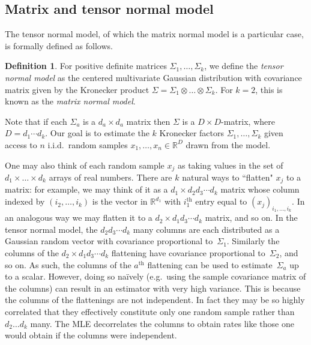 \documentclass[aos]{imsart}
\theoremstyle{definition}
\newtheorem*{definition}{Definition}
\numberwithin{equation}{section}
\newcommand{\R}{{\mathbb{R}}}
\newcommand{\ot}{\otimes}
\begin{document}
\subsection{Matrix and tensor normal model}\label{subsec:model}
The tensor normal model, of which the matrix normal model is a particular case, is formally defined as follows.

\begin{definition}
For positive definite matrices $\Sigma_1,\dots,\Sigma_k$, we define the \emph{tensor normal model} as the centered multivariate Gaussian distribution with covariance matrix given by the Kronecker product $\Sigma = \Sigma_1 \ot \dots \ot \Sigma_k$.
For $k=2$, this is known as the \emph{matrix normal model}.
\end{definition}

\noindent
Note that if each $\Sigma_a$ is a $d_a\times d_a$ matrix then $\Sigma$ is a $D\times D$-matrix, where $D=d_1 \cdots d_k$.
Our goal is to estimate the $k$ Kronecker factors $\Sigma_1, \dots, \Sigma_k$ given access to $n$ i.i.d.\ random samples $x_1, \dots, x_n \in \R^D$ drawn from the model.

One may also think of each random sample $x_j$ as taking values in the set of $d_1 \times \dots \times d_k$ arrays of real numbers.
There are $k$ natural ways to ``flatten" $x_j$ to a matrix:
for example, we may think of it as a $d_1 \times d_2d_3\cdots{}d_k$ matrix whose column indexed by $(i_2,\dots, i_k)$ is the vector in $\R^{d_1}$ with $i_1^{\text{th}}$ entry equal to $(x_j)_{i_1, \dots, i_k}$.
In an analogous way we may flatten it to a $d_2 \times d_1d_3\cdots{}d_k$ matrix, and so on.
In the tensor normal model, the $d_2d_3\cdots{}d_k$ many columns are each distributed as a Gaussian random vector with covariance proportional to~$\Sigma_1$.
Similarly the columns of the $d_2 \times d_1d_3\cdots{}d_k$ flattening have covariance proportional to~$\Sigma_2$, and so on.
As such, the columns of the $a^{\text{th}}$ flattening can be used to estimate~$\Sigma_a$ up to a scalar.
However, doing so na\"ively (e.g.\ using the sample covariance matrix of the columns) can result in an estimator with very high variance.
This is because the columns of the flattenings are not independent.
In fact they may be so highly correlated that they effectively constitute only one random sample rather than $d_2\dots d_k$ many.
The MLE decorrelates the columns to obtain rates like those one would obtain if the columns were independent.
\end{document}
